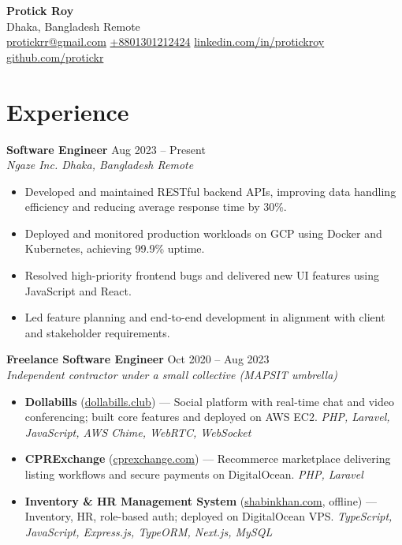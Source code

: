 \documentclass[a4paper,10pt]{article}
\begin{document}
{\LARGE \textbf{Protick Roy}}\\[-1pt]
Dhaka, Bangladesh \textbar{} Remote \\[-1pt]
\href{mailto:protickrr@gmail.com}{protickrr@gmail.com} \textbar{} \href{tel:+8801301212424}{+8801301212424}\textbar{} 
\href{https://www.linkedin.com/in/protickroy}{linkedin.com/in/protickroy} \textbar{} 
\href{https://github.com/protickr}{github.com/protickr}

\vspace{6pt}

\section*{Experience}

\textbf{Software Engineer} \hfill Aug 2023 -- Present\\[-2pt]
\textit{Ngaze Inc. \textbar{} Dhaka, Bangladesh \textbar{} Remote}\\[-4pt]
\begin{itemize}
  \item Developed and maintained RESTful backend APIs, improving data handling efficiency and reducing average response time by 30\%.
  \item Deployed and monitored production workloads on GCP using Docker and Kubernetes, achieving 99.9\% uptime.
  \item Resolved high-priority frontend bugs and delivered new UI features using JavaScript and React.
  \item Led feature planning and end-to-end development in alignment with client and stakeholder requirements.
\end{itemize}

\textbf{Freelance Software Engineer} \hfill Oct 2020 -- Aug 2023\\[-2pt]
\textit{Independent contractor under a small collective (MAPSIT umbrella)}\\[-4pt]
\begin{itemize}
  \item \textbf{Dollabills} (\href{https://dollabills.club}{dollabills.club}) --- Social platform with real-time chat and video conferencing; built core features and deployed on AWS EC2. \emph{PHP, Laravel, JavaScript, AWS Chime, WebRTC, WebSocket}
  \item \textbf{CPRExchange} (\href{https://cprexchange.com}{cprexchange.com}) --- Recommerce marketplace delivering listing workflows and secure payments on DigitalOcean. \emph{PHP, Laravel}
  \item \textbf{Inventory \& HR Management System} (\href{http://shabinkhan.com}{shabinkhan.com}, offline) --- Inventory, HR, role-based auth; deployed on DigitalOcean VPS. \emph{TypeScript, JavaScript, Express.js, TypeORM, Next.js, MySQL}
\end{itemize}
\end{document}
